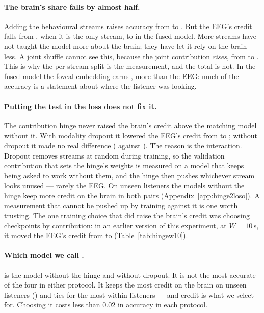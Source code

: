 \paragraph{The brain's share falls by almost half.}
Adding the behavioural streams raises accuracy from  to
. But the EEG's credit falls from , when it
is the only stream, to  in the fused model. More streams have
not taught the model more about the brain; they have let it rely on the brain
less. A joint shuffle cannot see this, because the joint contribution
\emph{rises}, from  to . This is why the
per-stream split is the measurement, and the total is not. In the fused model the
foveal embedding earns , more than the EEG: much of the
accuracy is a statement about where the listener was looking.

\paragraph{Putting the test in the loss does not fix it.}
The contribution hinge never raised the brain's credit above the matching model
without it. With modality dropout it lowered the EEG's credit from
 to ; without dropout it made no real
difference ( against ). The reason is the
interaction. Dropout removes streams at random during training, so the
validation contribution that sets the hinge's weights is measured on a model that
keeps being asked to work without them, and the hinge then pushes whichever
stream looks unused --- rarely the EEG. On unseen listeners the models without the
hinge keep more credit on the brain in both pairs (Appendix~\ref{app:hinge2loso}).
A measurement that cannot be pushed up by training against it is one worth
trusting. The one training choice that did raise the brain's credit was choosing
checkpoints by contribution: in an earlier version of this experiment, at
$W=10$\,s, it moved the
EEG's credit from  to
 (Table~\ref{tab:hingew10}).

\paragraph{Which model we call \merit{}.}
\merit{} is the model without the hinge and without dropout. It is not the most
accurate of the four in either protocol. It keeps the most credit on the brain on
unseen listeners () and ties for the most within listeners
--- and credit is what we select for. Choosing it costs less than $0.02$ in
accuracy in each protocol.

